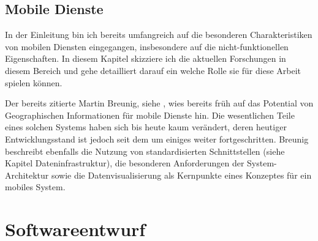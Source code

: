 \section{Mobile Dienste}
In der Einleitung bin ich bereits umfangreich auf die besonderen Charakteristiken von mobilen Diensten eingegangen, insbesondere auf die nicht-funktionellen Eigenschaften. In diesem Kapitel skizziere ich die aktuellen Forschungen in diesem Bereich und gehe detailliert darauf ein welche Rolle sie für diese Arbeit spielen können.

Der bereits zitierte Martin Breunig, siehe \citep{breunig_entwicklung_2003}, wies bereits früh auf das Potential von Geographischen Informationen für mobile Dienste hin. Die wesentlichen Teile eines solchen Systems haben sich bis heute kaum verändert, deren heutiger Entwicklungsstand ist jedoch seit dem um einiges weiter fortgeschritten. Breunig beschreibt ebenfalls die Nutzung von standardisierten Schnittstellen (siehe Kapitel Dateninfrastruktur), die besonderen Anforderungen der System-Architektur sowie die Datenvisualisierung als Kernpunkte eines Konzeptes für ein mobiles System.


\chapter{Softwareentwurf}
